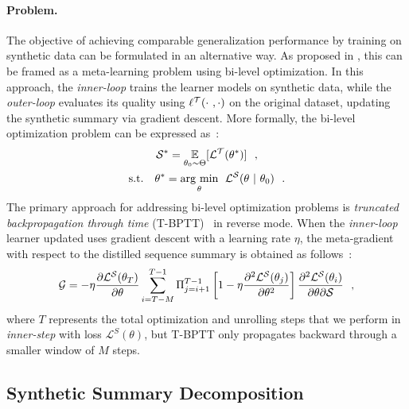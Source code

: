 \paragraph{Problem.}

The objective of achieving comparable generalization performance by training on synthetic data can be formulated in an alternative way. As proposed in \cite{wang2018dataset}, this can be framed as a meta-learning problem using bi-level optimization. In this approach, the \emph{inner-loop} trains the learner models on synthetic data, while the \emph{outer-loop} evaluates its quality using $\ell^{\mathcal{T}}(\cdot~,\cdot)$ on the original dataset, updating the synthetic summary via gradient descent. More formally, the bi-level optimization problem can be expressed as~:
\begin{equation} \label{eq4}
\begin{gathered}
    \mathcal{S}^{*} = \underset{\theta_0 \sim \Theta}{\mathbb{E}}[\mathcal{L}^{\mathcal{T}}(\theta^*)] ~~, \\
    \text{s.t.} \quad \theta^* = \underset{\theta}{\operatorname{arg}\,\operatorname{min}}\;\  \mathcal{L}^{\mathcal{S}}(\theta ~|~ \theta_0) ~~.
\end{gathered}
\end{equation}
The primary approach for addressing bi-level optimization problems is \emph{truncated backpropagation through time} (T-BPTT)~\cite{williams1990efficient, puskorius1994truncated} in reverse mode. When the \emph{inner-loop} learner updated uses gradient descent with a learning rate $\eta$, the meta-gradient with respect to the distilled sequence summary is obtained as follows~:
\begin{equation}
    \mathcal{G} = - \eta \frac{\partial\mathcal{L}^{\mathcal{S}}(\theta_{T})}{\partial\theta} \sum_{i=T-M}^{T-1} \Pi_{j=i+1}^{T-1} \left[1 - \eta \frac{\partial^{2}\mathcal{L}^{\mathcal{S}}(\theta_{j})}{\partial\theta^{2}}\right] \frac{\partial^{2}\mathcal{L}^{\mathcal{S}}(\theta_{i})}{\partial\theta \partial\mathcal{S}} ~~,
\end{equation}
where $T$ represents the total optimization and unrolling steps that we perform in \emph{inner-step} with loss $\mathcal{L}^{S}(\theta)$, but T-BPTT only propagates backward through a smaller window of $M$ steps.



\subsection{Synthetic Summary Decomposition}



